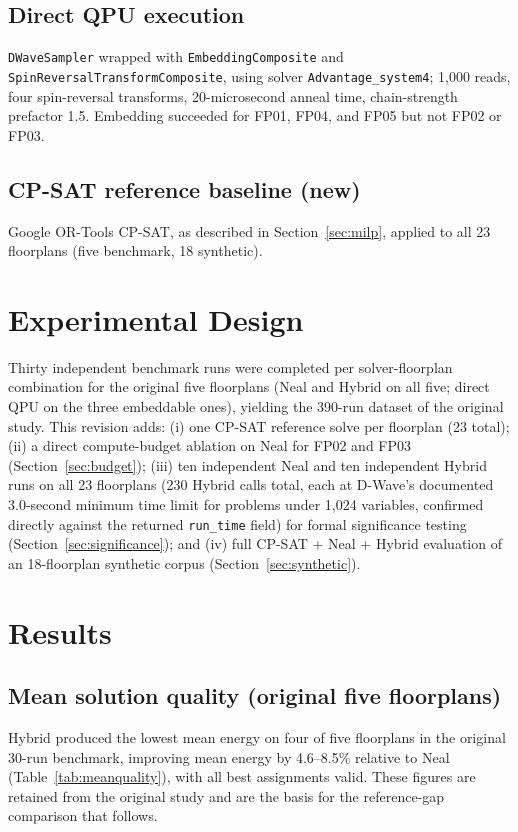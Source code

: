 \documentclass[11pt]{article}
\begin{document}
\subsection{Direct QPU execution}
\texttt{DWaveSampler} wrapped with \texttt{EmbeddingComposite} and \texttt{SpinReversalTransformComposite}, using solver \texttt{Advantage\_system4}; 1,000 reads, four spin-reversal transforms, 20-microsecond anneal time, chain-strength prefactor 1.5. Embedding succeeded for FP01, FP04, and FP05 but not FP02 or FP03.

\subsection{CP-SAT reference baseline (new)}
Google OR-Tools CP-SAT, as described in Section~\ref{sec:milp}, applied to all 23 floorplans (five benchmark, 18 synthetic).

\section{Experimental Design}

Thirty independent benchmark runs were completed per solver-floorplan combination for the original five floorplans (Neal and Hybrid on all five; direct QPU on the three embeddable ones), yielding the 390-run dataset of the original study. This revision adds: (i) one CP-SAT reference solve per floorplan (23 total); (ii) a direct compute-budget ablation on Neal for FP02 and FP03 (Section~\ref{sec:budget}); (iii) ten independent Neal and ten independent Hybrid runs on all 23 floorplans (230 Hybrid calls total, each at D-Wave's documented 3.0-second minimum time limit for problems under 1,024 variables, confirmed directly against the returned \texttt{run\_time} field) for formal significance testing (Section~\ref{sec:significance}); and (iv) full CP-SAT + Neal + Hybrid evaluation of an 18-floorplan synthetic corpus (Section~\ref{sec:synthetic}).

\section{Results}

\subsection{Mean solution quality (original five floorplans)}
Hybrid produced the lowest mean energy on four of five floorplans in the original 30-run benchmark, improving mean energy by 4.6--8.5\% relative to Neal (Table~\ref{tab:meanquality}), with all best assignments valid. These figures are retained from the original study and are the basis for the reference-gap comparison that follows.
\end{document}
